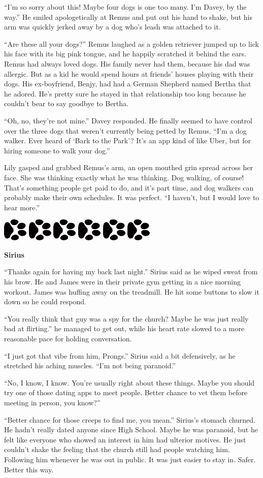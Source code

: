 \documentclass[12pt,twoside,openright]{memoir}
\newcommand{\dogPrintRule}{	
	\begin{center}
		\hspace{.5em}
		\includegraphics[angle=60]{dogprint.pdf}
		\hspace{.5em}
		\includegraphics[angle=120]{dogprint.pdf}
		\hspace{.5em}
		\includegraphics[angle=60]{dogprint.pdf}
		\hspace{.5em}
		\includegraphics[angle=120]{dogprint.pdf}
		\hspace{.5em}
		\includegraphics[angle=60]{dogprint.pdf}
		\hspace{.5em}
		\includegraphics[angle=120]{dogprint.pdf}
		\hspace{.5em}
	\end{center}
}
\begin{document}
``I'm so sorry about this! Maybe four dogs is one too many. I'm Davey, by the way.'' He smiled apologetically at Remus and put out his hand to shake, but his arm was quickly jerked away by a dog who's leash was attached to it.

``Are these all your dogs?'' Remus laughed as a golden retriever jumped up to lick his face with its big pink tongue, and he happily scratched it behind the ears. Remus had always loved dogs. His family never had them, because his dad was allergic. But as a kid he would spend hours at friends' houses playing with their dogs. His ex-boyfriend, Benjy, had had a German Shepherd named Bertha that he adored. He's pretty sure he stayed in that relationship too long because he couldn't bear to say goodbye to Bertha.

``Oh, no, they're not mine.'' Davey responded. He finally seemed to have control over the three dogs that weren't currently being petted by Remus. ``I'm a dog walker. Ever heard of ‘Bark to the Park'? It's an app kind of like Uber, but for hiring someone to walk your dog.'' 

Lily gasped and grabbed Remus's arm, an open mouthed grin spread across her face. She was thinking exactly what he was thinking. Dog walking, of course! That's something people get paid to do, and it's part time, and dog walkers can probably make their own schedules. It was perfect. ``I haven't, but I would love to hear more.'' 

\dogPrintRule

\textbf{Sirius} 

``Thanks again for having my back last night.'' Sirius said as he wiped sweat from his brow. He and James were in their private gym getting in a nice morning workout. James was huffing away on the treadmill. He hit some buttons to slow it down so he could respond.

``You really think that guy was a spy for the church? Maybe he was just really bad at flirting.'' he managed to get out, while his heart rate slowed to a more reasonable pace for holding conversation.

``I just got that vibe from him, Prongs.'' Sirius said a bit defensively, as he stretched his aching muscles. ``I'm not being paranoid.''

``No, I know, I know. You're usually right about these things. Maybe you should try one of those dating apps to meet people. Better chance to vet them before meeting in person, you know?''

``Better chance for those creeps to find me, you mean.'' Sirius's stomach churned. He hadn't really dated anyone since High School. Maybe he was paranoid, but he felt like everyone who showed an interest in him had ulterior motives. He just couldn't shake the feeling that the church still had people watching him. Following him whenever he was out in public. It was just easier to stay in. Safer. Better this way.
\end{document}

